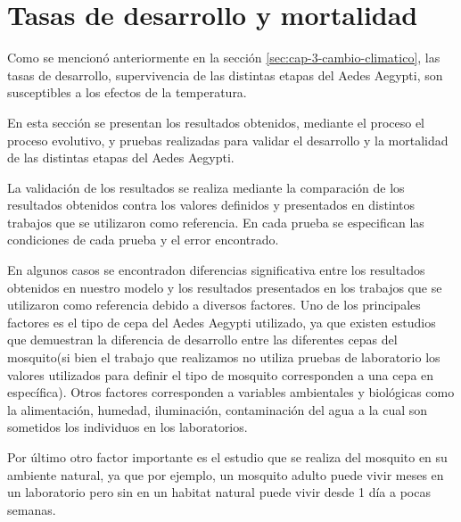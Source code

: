 \section{Tasas de desarrollo y mortalidad}

Como se mencionó anteriormente en la sección \ref{sec:cap-3-cambio-climatico}, las tasas de desarrollo,
supervivencia de las distintas etapas del Aedes Aegypti, son susceptibles a los efectos de la 
temperatura. 

En esta sección se presentan los resultados obtenidos, mediante el proceso el proceso evolutivo, y 
pruebas realizadas para validar el desarrollo y la mortalidad de las distintas etapas del Aedes Aegypti.

La validación de los resultados se realiza mediante la comparación de los resultados obtenidos contra los valores definidos y presentados en distintos trabajos que se utilizaron como referencia. En cada prueba se especifican las condiciones de cada prueba y el error encontrado.

En algunos casos se encontradon diferencias significativa entre los resultados obtenidos en nuestro modelo y los resultados presentados en los trabajos que se utilizaron como referencia debido a diversos factores.
Uno de los principales factores es el tipo de cepa del Aedes Aegypti utilizado, ya que existen estudios que demuestran la diferencia de desarrollo entre las diferentes cepas del mosquito(si bien el trabajo que realizamos no utiliza pruebas de laboratorio los valores utilizados para definir el tipo de mosquito corresponden a una cepa en específica). Otros factores corresponden a variables ambientales y biológicas como la alimentación, humedad, iluminación, contaminación del agua a la cual son sometidos los individuos en los laboratorios.

Por último otro factor importante es el estudio que se realiza del mosquito en su ambiente natural, ya que por ejemplo, un mosquito adulto puede vivir meses en un laboratorio pero sin en un habitat natural puede vivir desde 1 día a pocas semanas. 







